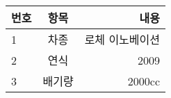 \documentclass[12pt]{article}
\begin{document}

	\begin{tabular}{ l | c | r }
		\hline
		번호 & 항목 & 내용 \\ 
		\hline \hline
		1 & 차종 & 로체 이노베이션 \\
		2 & 연식 & 2009 \\
		3 & 배기량 & 2000cc \\
		\hline
	\end{tabular} 
\end{document}
